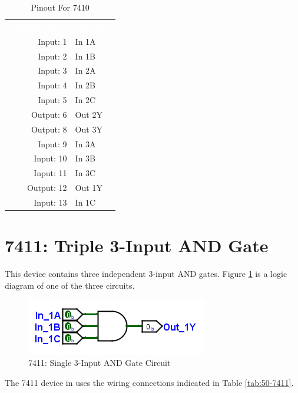 \begin{table}[H]
	\sffamily
	\newcommand{\head}[1]{\textcolor{white}{\textbf{#1}}}		
	\begin{center}
		\begin{tabular}{rl} 
			\rowcolor{black!75}
			\head{Logisim Label} & \head{Function} \\
			Input: 1   & In 1A  \\
			Input: 2   & In 1B  \\
			Input: 3   & In 2A \\
			Input: 4   & In 2B  \\
			Input: 5   & In 2C  \\
			Output: 6  & Out 2Y \\
			Output: 8  & Out 3Y \\
			Input: 9   & In 3A  \\
			Input: 10  & In 3B  \\
			Input: 11  & In 3C \\
			Output: 12 & Out 1Y  \\
			Input: 13  & In 1C  \\
		\end{tabular}
	\end{center}
	\caption{Pinout For 7410}
	\label{tab:50-7410}
\end{table}

\section{7411: Triple 3-Input AND Gate}

This device contains three independent 3-input AND gates. Figure \ref{fig:50-7411} is a logic diagram of one of the three circuits.

\begin{figure}[H]
	\centering
	\includegraphics{gfx/50-7411}
	\caption{7411: Single 3-Input AND Gate Circuit}
	\label{fig:50-7411}
\end{figure}

The 7411 device in \LE uses the wiring connections indicated in Table \ref{tab:50-7411}.

